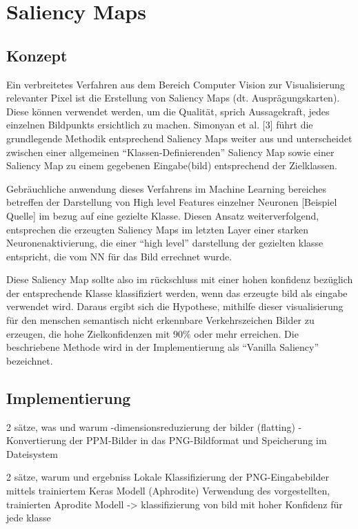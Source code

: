 \chapter{Saliency Maps}

\section{Konzept}
Ein verbreitetes Verfahren aus dem Bereich Computer Vision zur Visualisierung relevanter Pixel ist die Erstellung von Saliency Maps (dt. Ausprägungskarten). Diese können verwendet werden, um die Qualität, sprich Aussagekraft, jedes einzelnen Bildpunkts ersichtlich zu machen. Simonyan et al. [3] führt die grundlegende Methodik entsprechend Saliency Maps weiter aus und unterscheidet zwischen einer allgemeinen “Klassen-Definierenden” Saliency Map sowie einer Saliency Map zu einem gegebenen Eingabe(bild) entsprechend der Zielklassen.


Gebräuchliche anwendung dieses Verfahrens im Machine Learning bereiches betreffen der Darstellung von High level Features einzelner Neuronen [Beispiel Quelle] im bezug auf eine gezielte Klasse. Diesen Ansatz weiterverfolgend, entsprechen die erzeugten Saliency Maps im letzten Layer einer starken Neuronenaktivierung, die einer “high level” darstellung der gezielten klasse entspricht, die vom NN für das Bild errechnet wurde. 


Diese Saliency Map sollte also im rückschluss mit einer hohen konfidenz bezüglich der entsprechende Klasse klassifiziert werden, wenn das erzeugte bild als eingabe verwendet wird. Daraus ergibt sich die Hypothese, mithilfe dieser visualisierung für den menschen semantisch nicht erkennbare Verkehrszeichen Bilder zu erzeugen, die hohe Zielkonfidenzen mit $90\%$ oder mehr erreichen. Die beschriebene Methode wird in der Implementierung als “Vanilla Saliency” bezeichnet.

\section{Implementierung}
2 sätze, was und warum
-dimensionsreduzierung der bilder (flatting)
-Konvertierung der PPM-Bilder in das PNG-Bildformat und Speicherung im Dateisystem


2 sätze, warum und ergebniss
Lokale Klassifizierung der PNG-Eingabebilder mittels trainiertem Keras Modell  (Aphrodite)
Verwendung des vorgestellten, trainierten Aprodite Modell -> klassifizierung von bild mit hoher Konfidenz für jede klasse


